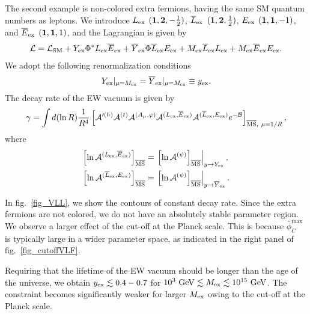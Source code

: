 \documentclass[12pt]{article}
\begin{document}
The second example is non-colored extra fermions, having the same SM quantum
numbers as leptons.
We introduce
$L_{\rm ex}$ $({\bf 1}, {\bf 2},-\frac{1}{2})$, 
$\overline{L}_{\rm ex}$ $({\bf 1}, {\bf 2},\frac{1}{2})$, 
$E_{\rm ex}$ $({\bf 1}, {\bf 1},-1)$, and
$\overline{E}_{\rm ex}$ $({\bf 1}, {\bf 1},1)$, and the Lagrangian is
given by
\begin{align}
 \mathcal L = \mathcal L_{\rm SM}
 +Y_{\rm ex}\Phi^* L_{\rm ex}\overline{E}_{\rm ex}
 +\overline{Y}_{\rm ex}\Phi\overline{L}_{\rm ex}E_{\rm ex}
 +M_{\rm ex}\overline{L}_{\rm ex}L_{\rm ex}
 +M_{\rm ex}\overline{E}_{\rm ex}E_{\rm ex}.
\end{align}
We adopt the following renormalization conditions
\begin{align}
  Y_{\rm ex}|_{\mu=M_{\rm ex}}
  = \overline{Y}_{\rm ex}|_{\mu=M_{\rm ex}}
  \equiv y_{\rm ex}.
  \label{eq_RGEboundary}
\end{align}
The decay rate of the EW vacuum is given by
\begin{align}
  \gamma = \int d(\ln R)\frac{1}{R^4}
  \left[
    \mathcal A'^{(h)}\mathcal A^{(t)}\mathcal A^{(A_\mu,\varphi)}
    \mathcal A^{(L_{\rm ex},\overline{E}_{\rm ex})}
    \mathcal A^{(\overline{L}_{\rm ex},E_{\rm ex})}
    e^{-\mathcal B}
  \right]_{\overline{\rm MS},~\mu=1/R},
\end{align}
where
\begin{align}
  \left[
    \ln \mathcal A^{(L_{\rm ex},\overline{E}_{\rm ex})}
  \right]_{\overline{\rm MS}}
  & = \left.
    \left[
      \ln \mathcal A^{(\psi)}
    \right]_{\overline{\rm MS}}
  \right|_{y\to Y_{\rm ex}}, \\
  \left[
    \ln \mathcal A^{(\overline{L}_{\rm ex},E_{\rm ex})}
  \right]_{\overline{\rm MS}}
  & = \left.
    \left[
      \ln \mathcal A^{(\psi)}
    \right]_{\overline{\rm MS}}
  \right|_{y\to \overline Y_{\rm ex}}.
\end{align}

In fig.\ \ref{fig_VLL}, we show the contours of constant decay
rate. Since the extra fermions are not colored, we do not have an
absolutely stable parameter region. We observe a larger effect of the
cut-off at the Planck scale. This is because $\bar\phi_C^{\max}$ is
typically large in a wider parameter space, as indicated in the right
panel of fig.\ \ref{fig_cutoffVLF}.

Requiring that the lifetime of the EW vacuum should be longer than the
age of the universe, we obtain $y_{\rm ex}\lesssim0.4-0.7$ for
$10^3~{\rm GeV}\lesssim M_{\rm ex}\lesssim10^{15}~{\rm GeV}$. The
constraint becomes significantly weaker for larger $M_{\rm ex}$ owing to
the cut-off at the Planck scale.
\end{document}
